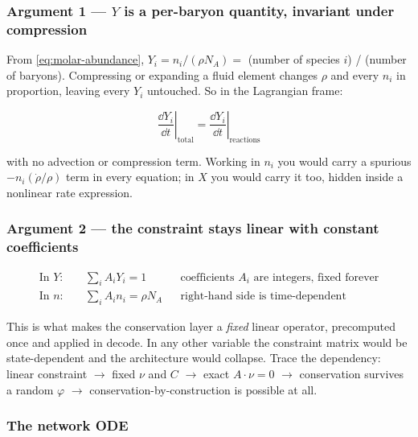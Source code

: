 \subsubsection{Argument 1 --- \texorpdfstring{$Y$}{Y} is a per-baryon quantity,
  invariant under compression}
\label{sec:perbaryon}

From \eqref{eq:molar-abundance}, $Y_i = n_i/(\rho N_A) =$ (number of species
$i$) / (number of baryons). Compressing or expanding a fluid element changes
$\rho$ and every $n_i$ in proportion, leaving every $Y_i$ untouched. So in the
Lagrangian frame:

\begin{equation*}
\left.\frac{\dd Y_i}{\dd t}\right|_{\text{total}}
= \left.\frac{\dd Y_i}{\dd t}\right|_{\text{reactions}}
\end{equation*}

with no advection or compression term. Working in $n_i$ you would carry a
spurious $-n_i(\dot\rho/\rho)$ term in every equation; in $X$ you would carry it
too, hidden inside a nonlinear rate expression.

\subsubsection{Argument 2 --- the constraint stays linear with constant coefficients}
\label{sec:linearconstraint}

\begin{equation*}
\begin{aligned}
\text{In } Y: &\quad \sum_i A_i Y_i = 1
  && \text{coefficients } A_i \text{ are integers, fixed forever}\\
\text{In } n: &\quad \sum_i A_i n_i = \rho N_A
  && \text{right-hand side is time-dependent}
\end{aligned}
\end{equation*}

This is what makes the conservation layer a \emph{fixed} linear operator,
precomputed once and applied in decode. In any other variable the constraint
matrix would be state-dependent and the architecture would collapse. Trace the
dependency: linear constraint $\to$ fixed $\nu$ and $C$ $\to$ exact
$A\cdot\nu = 0$ $\to$ conservation survives a random $\varphi$ $\to$
conservation-by-construction is possible at all.

\subsubsection{The network ODE}
\label{sec:networkode}


